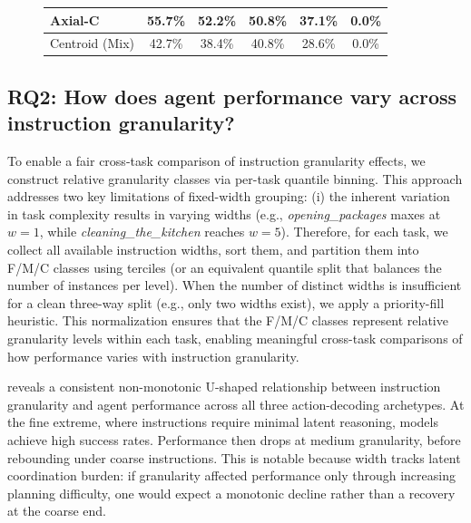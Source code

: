 \documentclass[11pt]{article}
\begin{document}
\begin{figure}[t]
\begin{minipage}[b]{0.60\textwidth}
{\begin{tabular}{lccccc}
        Axial-C         & 55.7\% & 52.2\% & 50.8\% & 37.1\% & 0.0\% \\ 
        \midrule
        Centroid (Mix)  & 42.7\% & 38.4\% & 40.8\% & 28.6\% & 0.0\% \\
        \bottomrule
        \end{tabular}%
        }
        \label{tab:q3_cross_granularity}
    \end{minipage}
    
\end{figure}

\subsection{RQ2: How does agent performance vary across instruction granularity?}
\label{sec:rq2_u_shape}

To enable a fair cross-task comparison of instruction granularity effects, we construct relative granularity classes via per-task quantile binning. This approach addresses two key limitations of fixed-width grouping: (i) the inherent variation in task complexity results in varying widths (e.g., \emph{opening\_packages} maxes at $w=1$, while \emph{cleaning\_the\_kitchen} reaches $w=5$). Therefore, for each task, we collect all available instruction widths, sort them, and partition them into F/M/C classes using terciles (or an equivalent quantile split that balances the number of instances per level). When the number of distinct widths is insufficient for a clean three-way split (e.g., only two widths exist), we apply a priority-fill heuristic. This normalization ensures that the F/M/C classes represent relative granularity levels within each task, enabling meaningful cross-task comparisons of how performance varies with instruction granularity.

 reveals a consistent non-monotonic U-shaped relationship between instruction granularity and agent performance across all three action-decoding archetypes. At the fine extreme, where instructions require minimal latent reasoning, models achieve high success rates. Performance then drops at medium granularity, before rebounding under coarse instructions. This is notable because width tracks latent coordination burden: if granularity affected performance only through increasing planning difficulty, one would expect a monotonic decline rather than a recovery at the coarse end.
\end{document}
